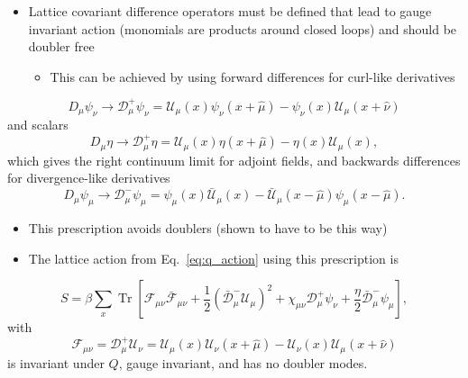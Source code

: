 \begin{itemize}
    \item Lattice covariant difference operators must be defined that lead to gauge invariant action (monomials are products around closed loops) and should be doubler free
    \begin{itemize}
        \item This can be achieved by using forward differences for curl-like derivatives
    \end{itemize}
\end{itemize}
\begin{equation}
    D_\mu \psi_\nu \to \mathcal{D}_\mu^+ \psi_\nu = \mathcal{U}_\mu(x) \psi_\nu(x + \hat{\mu}) - \psi_\nu(x) \mathcal{U}_\mu(x + \hat{\nu})
\end{equation}
and scalars
\begin{equation}
    D_\mu \eta \to \mathcal{D}_\mu^+ \eta = \mathcal{U}_\mu(x) \eta(x + \hat{\mu}) - \eta(x) \mathcal{U}_\mu(x),
\end{equation}
which gives the right continuum limit for adjoint fields, and backwards differences for divergence-like derivatives
\begin{equation}
    D_\mu \psi_\mu \to \mathcal{D}_\mu^- \psi_\mu = \psi_\mu (x) \bar{\mathcal{U}}_\mu(x) - \bar{\mathcal{U}}_\mu(x - \hat{\mu}) \psi_\mu(x - \hat{\mu}).
\end{equation}
\begin{itemize}
    \item This prescription avoids doublers (shown to have to be this way)
    \item The lattice action from Eq.~\eqref{eq:q_action} using this prescription is
\end{itemize}
\begin{equation}
    S = \beta \sum_x \operatorname{Tr}\left[\mathcal{F}_{\mu \nu}\bar{\mathcal{F}}_{\mu \nu} + \frac{1}{2}(\bar{\mathcal{D}}_\mu^- \mathcal{U}_\mu)^2 + \chi_{\mu \nu}\mathcal{D}_\mu^+ \psi_\nu + \frac{\eta}{2}\bar{\mathcal{D}}^-_\mu \psi_\mu\right],
\end{equation}
with
\begin{equation}
    \mathcal{F}_{\mu \nu} = \mathcal{D}_\mu^+ \mathcal{U}_\nu = \mathcal{U}_\mu(x) \mathcal{U}_\nu(x + \hat{\mu}) - \mathcal{U}_\nu(x) \mathcal{U}_\mu(x + \hat{\nu})
\end{equation}
is invariant under $Q$, gauge invariant, and has no doubler modes.


